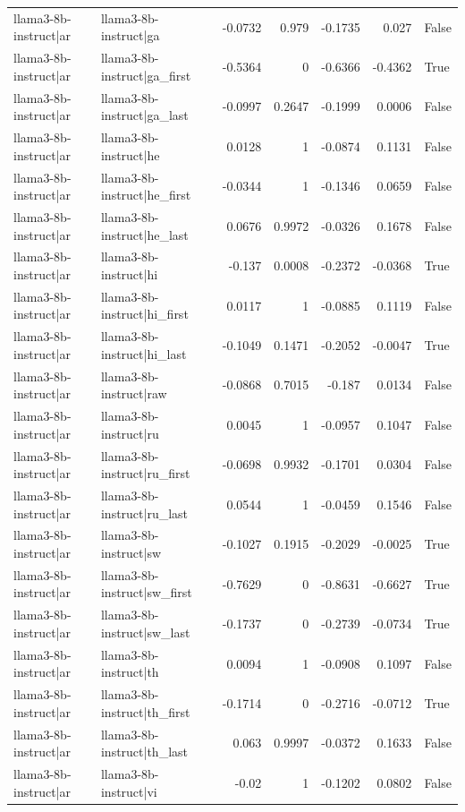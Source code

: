 \begin{table}
\begin{tabular}{l l r r r r l}
llama3-8b-instruct|ar & llama3-8b-instruct|ga & -0.0732 & 0.979 & -0.1735 & 0.027 & False \\
llama3-8b-instruct|ar & llama3-8b-instruct|ga_first & -0.5364 & 0 & -0.6366 & -0.4362 & True \\
llama3-8b-instruct|ar & llama3-8b-instruct|ga_last & -0.0997 & 0.2647 & -0.1999 & 0.0006 & False \\
llama3-8b-instruct|ar & llama3-8b-instruct|he & 0.0128 & 1 & -0.0874 & 0.1131 & False \\
llama3-8b-instruct|ar & llama3-8b-instruct|he_first & -0.0344 & 1 & -0.1346 & 0.0659 & False \\
llama3-8b-instruct|ar & llama3-8b-instruct|he_last & 0.0676 & 0.9972 & -0.0326 & 0.1678 & False \\
llama3-8b-instruct|ar & llama3-8b-instruct|hi & -0.137 & 0.0008 & -0.2372 & -0.0368 & True \\
llama3-8b-instruct|ar & llama3-8b-instruct|hi_first & 0.0117 & 1 & -0.0885 & 0.1119 & False \\
llama3-8b-instruct|ar & llama3-8b-instruct|hi_last & -0.1049 & 0.1471 & -0.2052 & -0.0047 & True \\
llama3-8b-instruct|ar & llama3-8b-instruct|raw & -0.0868 & 0.7015 & -0.187 & 0.0134 & False \\
llama3-8b-instruct|ar & llama3-8b-instruct|ru & 0.0045 & 1 & -0.0957 & 0.1047 & False \\
llama3-8b-instruct|ar & llama3-8b-instruct|ru_first & -0.0698 & 0.9932 & -0.1701 & 0.0304 & False \\
llama3-8b-instruct|ar & llama3-8b-instruct|ru_last & 0.0544 & 1 & -0.0459 & 0.1546 & False \\
llama3-8b-instruct|ar & llama3-8b-instruct|sw & -0.1027 & 0.1915 & -0.2029 & -0.0025 & True \\
llama3-8b-instruct|ar & llama3-8b-instruct|sw_first & -0.7629 & 0 & -0.8631 & -0.6627 & True \\
llama3-8b-instruct|ar & llama3-8b-instruct|sw_last & -0.1737 & 0 & -0.2739 & -0.0734 & True \\
llama3-8b-instruct|ar & llama3-8b-instruct|th & 0.0094 & 1 & -0.0908 & 0.1097 & False \\
llama3-8b-instruct|ar & llama3-8b-instruct|th_first & -0.1714 & 0 & -0.2716 & -0.0712 & True \\
llama3-8b-instruct|ar & llama3-8b-instruct|th_last & 0.063 & 0.9997 & -0.0372 & 0.1633 & False \\
llama3-8b-instruct|ar & llama3-8b-instruct|vi & -0.02 & 1 & -0.1202 & 0.0802 & False \\

\end{tabular}
\end{table}
